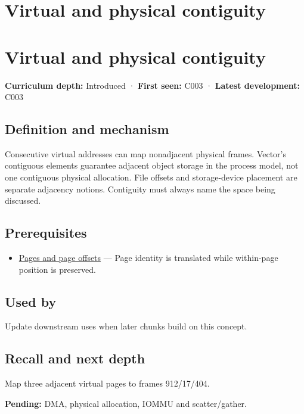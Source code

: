 \hypertarget{appendix-f897c1ddac8f}{}
\section*{Virtual and physical contiguity}
\section{Virtual and physical contiguity}\label{virtual-and-physical-contiguity}

\textbf{Curriculum depth:} Introduced · \textbf{First seen:} C003 · \textbf{Latest development:} C003

\subsection{Definition and mechanism}\label{definition-and-mechanism}

Consecutive virtual addresses can map nonadjacent physical frames. Vector's contiguous elements guarantee adjacent object storage in the process model, not one contiguous physical allocation. File offsets and storage-device placement are separate adjacency notions. Contiguity must always name the space being discussed.

\subsection{Prerequisites}\label{prerequisites}

\begin{itemize}
\tightlist
\item
  \hyperref[appendix-0c67cd5bf30a]{Pages and page offsets} --- Page identity is translated while within-page position is preserved.
\end{itemize}

\subsection{Used by}\label{used-by}

Update downstream uses when later chunks build on this concept.

\subsection{Recall and next depth}\label{recall-and-next-depth}

Map three adjacent virtual pages to frames 912/17/404.

\textbf{Pending:} DMA, physical allocation, IOMMU and scatter/gather.

